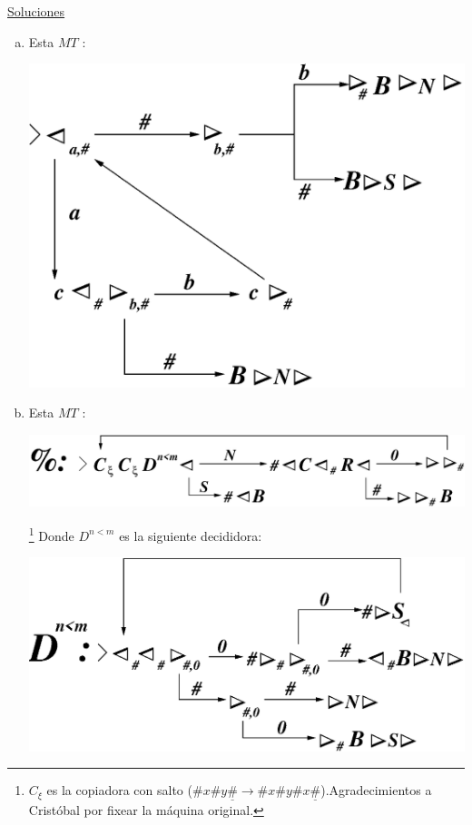 \documentclass[dcc]{fcfmcourse}
\begin{document}
\newpage
\begin{center}
{\huge \underline{Soluciones}}
\end{center}
\begin{problems}
\problem
\begin{enumerate}[a)]
    \item Esta $MT$ :
    \begin{center}
    \includegraphics[scale=1]{P0a.eps}
    \end{center}
    \item Esta $MT$ :
    \begin{center}
    \includegraphics[scale=0.8]{P01b.eps}
    \end{center}
    \footnote{$C_{\xi}$ es la copiadora con salto ($\#x\#y\underline{\#}\rightarrow \#x\#y\#x\underline{\#}$).Agradecimientos a Cristóbal por fixear la máquina original.}
    \newpage
    Donde $D^{n<m}$ es la siguiente decididora:
    \begin{center}
    \includegraphics[scale=0.8]{P02b.eps}

\end{center}
\end{enumerate}
\end{problems}
\end{document}
